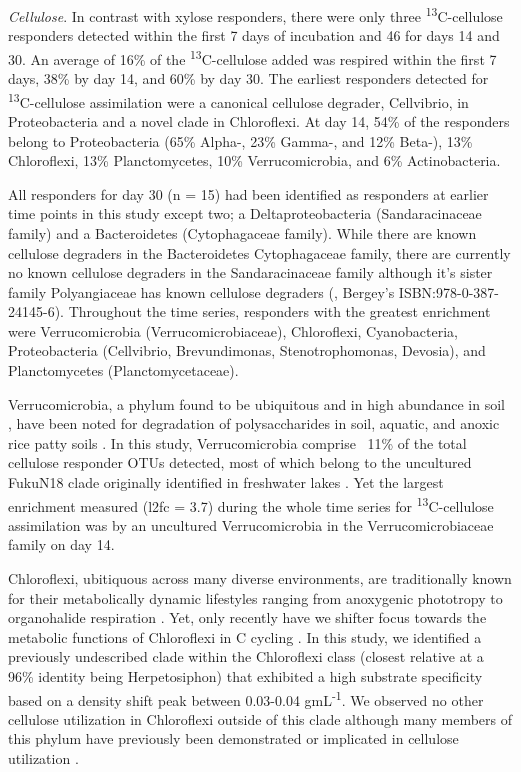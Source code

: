 \textit{Cellulose}. In contrast with xylose responders, there were only three \textsuperscript{13}C-cellulose responders detected within the first 7 days of incubation and 46 for days 14 and 30. An average of 16\% of the \textsuperscript{13}C-cellulose added was respired within the first 7 days, 38\% by day 14, and 60\% by day 30. The earliest responders detected for \textsuperscript{13}C-cellulose assimilation were a canonical cellulose degrader, Cellvibrio, in Proteobacteria and a novel clade in Chloroflexi. At day 14, 54\% of the responders belong to Proteobacteria (65\% Alpha-, 23\% Gamma-, and 12\% Beta-), 13\% Chloroflexi, 13\% Planctomycetes, 10\% Verrucomicrobia, and 6\% Actinobacteria.

All responders for day 30 (n = 15) had been identified as responders at earlier time points in this study except two; a Deltaproteobacteria (Sandaracinaceae family) and a Bacteroidetes (Cytophagaceae family). While there are known cellulose degraders in the Bacteroidetes Cytophagaceae family, there are currently no known cellulose degraders in the Sandaracinaceae family although it's sister family Polyangiaceae has known cellulose degraders (\cite{Reichenbach_2006}, Bergey's ISBN:978-0-387-24145-6). Throughout the time series, responders with the greatest enrichment were Verrucomicrobia (Verrucomicrobiaceae), Chloroflexi, Cyanobacteria, Proteobacteria (Cellvibrio, Brevundimonas, Stenotrophomonas, Devosia), and Planctomycetes (Planctomycetaceae).      

Verrucomicrobia, a phylum found to be ubiquitous and in high abundance in soil \cite{Zhang_2008, Bergmann_2011, Fierer_2013}, have been noted for degradation of polysaccharides in soil, aquatic, and anoxic rice patty soils \cite{Fierer_2013,Herlemann_2013,10543821}. In this study, Verrucomicrobia comprise ~11\% of the total cellulose responder OTUs detected, most of which belong to the uncultured FukuN18 clade originally identified in freshwater lakes \cite{14602613, Glockner_2000, Parveen_2013}. Yet the largest enrichment measured (l2fc = 3.7) during the whole time series for \textsuperscript{13}C-cellulose assimilation was by an uncultured Verrucomicrobia in the Verrucomicrobiaceae family on day 14. 

Chloroflexi, ubitiquous across many diverse environments, are traditionally known for their metabolically dynamic lifestyles ranging from anoxygenic phototropy to organohalide respiration \cite{Yamada_2009,14527284,Hug_2013,Seshadri_2005,Tang_2011,dworkin2006the}. Yet, only recently have we shifter focus towards the metabolic functions of Chloroflexi in C cycling \cite{Hug_2013,Goldfarb_2011,Cole_2013}. In this study, we identified a previously undescribed clade within the Chloroflexi class (closest relative at a 96\% identity being Herpetosiphon) that exhibited a high substrate specificity based on a density shift peak between 0.03-0.04 gmL\textsuperscript{-1}. We observed no other cellulose utilization in Chloroflexi outside of this clade although many members of this phylum have previously been demonstrated or implicated in cellulose utilization \cite{Goldfarb_2011,Cole_2013,Hug_2013}. 

